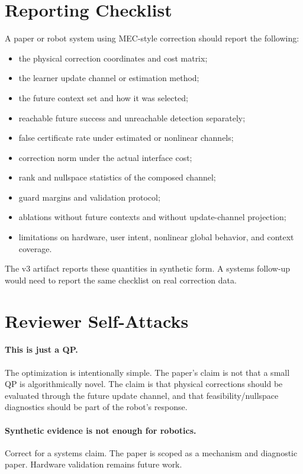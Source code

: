 \documentclass{article}
\begin{document}
\section{Reporting Checklist}

A paper or robot system using MEC-style correction should report the following:

\begin{itemize}
\item the physical correction coordinates and cost matrix;
\item the learner update channel or estimation method;
\item the future context set and how it was selected;
\item reachable future success and unreachable detection separately;
\item false certificate rate under estimated or nonlinear channels;
\item correction norm under the actual interface cost;
\item rank and nullspace statistics of the composed channel;
\item guard margins and validation protocol;
\item ablations without future contexts and without update-channel projection;
\item limitations on hardware, user intent, nonlinear global behavior, and
context coverage.
\end{itemize}

The v3 artifact reports these quantities in synthetic form. A systems follow-up
would need to report the same checklist on real correction data.

\section{Reviewer Self-Attacks}

\paragraph{This is just a QP.}
The optimization is intentionally simple. The paper's claim is not that a small
QP is algorithmically novel. The claim is that physical corrections should be
evaluated through the future update channel, and that feasibility/nullspace
diagnostics should be part of the robot's response.

\paragraph{Synthetic evidence is not enough for robotics.}
Correct for a systems claim. The paper is scoped as a mechanism and diagnostic
paper. Hardware validation remains future work.
\end{document}
